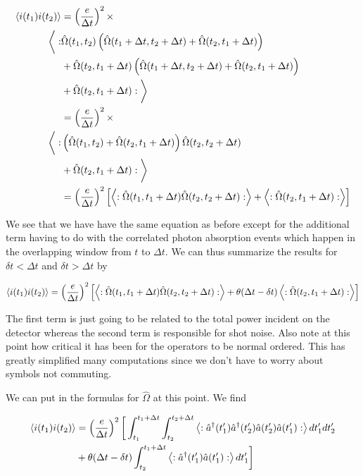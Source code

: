 \documentclass[12pt]{article}
\begin{document}
\begin{align}
\braket{i(t_1)i(t_2)} &= \left(\frac{e}{\Delta t}\right)^2 \times \\
\bigg<: &\hat{\Omega}(t_1, t_2)\left(\hat{\Omega}(t_1+\Delta t, t_2+\Delta t) + \hat{\Omega}( t_2,t_1+\Delta t)\right) \\
&+ \hat{\Omega}(t_2,t_1+\Delta t)\left( \hat{\Omega}(t_1+\Delta t, t_2+\Delta t)+ \hat{\Omega}(t_2,t_1+\Delta t) \right)\\
&+ \hat{\Omega}(t_2,t_1+\Delta t) :\bigg>\\
&= \left(\frac{e}{\Delta t}\right)^2 \times \\
\bigg<: & \left( \hat{\Omega}(t_1, t_2)+ \hat{\Omega}(t_2,t_1+\Delta t)\right) \hat{\Omega}( t_2, t_2+\Delta t) \\
&+\hat{\Omega}(t_2,t_1+\Delta t) :\bigg>\\
&=\left(\frac{e}{\Delta t}\right)^2 \left[\left<:\hat{\Omega}(t_1,t_1+\Delta t)\hat{\Omega}(t_2,t_2+\Delta t):\right> + \left<:\hat{\Omega}(t_2,t_1+\Delta t):\right>\right]
\end{align}

We see that we have have the same equation as before except for the additional term having to do with the correlated photon absorption events which happen in the overlapping window from $t$ to $\Delta t$. We can thus summarize the results for $\delta t<\Delta t$ and $\delta t>\Delta t$ by

\begin{equation}
\braket{i(t_1)i(t_2)} = \left(\frac{e}{\Delta t}\right)^2 \left[\left<:\hat{\Omega}(t_1,t_1+\Delta t)\hat{\Omega}(t_2,t_2+\Delta t):\right> + \theta(\Delta t-\delta t) \left<:\hat{\Omega}(t_2,t_1+\Delta t):\right>\right]
\end{equation}

The first term is just going to be related to the total power incident on the detector whereas the second term is responsible for shot noise. Also note at this point how critical it has been for the operators to be normal ordered. This has greatly simplified many computations since we don't have to worry about symbols not commuting.

We can put in the formulas for $\hat{\Omega}$ at this point. We find

\begin{align}
\braket{i(t_1)i(t_2)} &= \left(\frac{e}{\Delta t}\right)^2 \bigg[ \int_{t_1}^{t_1+\Delta t} \int_{t_2}^{t_2+\Delta t} \left<: \hat{a}^{\dag}(t_1')\hat{a}^{\dag}(t_2')\hat{a}(t_2')\hat{a}(t_1'):\right> dt_1' dt_2'\\
&+ \theta(\Delta t-\delta t)\int_{t_2}^{t_1+\Delta t} \left<:\hat{a}^{\dag}(t_1')\hat{a}(t_1'):\right> dt_1' \bigg]
\end{align}
\end{document}
